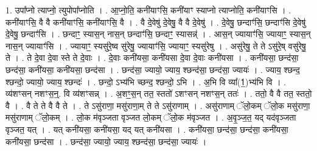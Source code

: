 \documentclass[17pt]{extarticle}
\begin{document}
1. उपा᳚प्नो त्याप्नो॒ त्युपोपा᳚प्नोति । . आ॒प्नो॒ति॒ कनी॑याꣳसि॒ कनी॑याꣳ स्याप्नो त्याप्नोति॒ कनी॑याꣳसि । . कनी॑याꣳसि॒ वै वै कनी॑याꣳसि॒ कनी॑याꣳसि॒ वै । . वै दे॒वेषु॑ दे॒वेषु॒ वै वै दे॒वेषु॑ । . दे॒वेषु॒ छन्दाꣳ॑सि॒ छन्दाꣳ॑सि दे॒वेषु॑ दे॒वेषु॒ छन्दाꣳ॑सि । . छन्दाꣳ॒॒ स्यास॒न् नास॒न् छन्दाꣳ॑सि॒ छन्दाꣳ॒॒ स्यासन्न्॑ । . आस॒न् ज्यायाꣳ॑सि॒ ज्यायाꣳ॒॒ स्यास॒न् नास॒न् ज्यायाꣳ॑सि । . ज्यायाꣳ॒॒ स्यसु॑रे॒ष्व सु॑रेषु॒ ज्यायाꣳ॑सि॒ ज्यायाꣳ॒॒ स्यसु॑रेषु । . असु॑रेषु॒ ते ते ऽसु॑रे॒ष् वसु॑रेषु॒ ते । . ते दे॒वा दे॒वा स्ते ते दे॒वाः । . दे॒वाः कनी॑यसा॒ कनी॑यसा दे॒वा दे॒वाः कनी॑यसा । . कनी॑यसा॒ छन्द॑सा॒ छन्द॑सा॒ कनी॑यसा॒ कनी॑यसा॒ छन्द॑सा । . छन्द॑सा॒ ज्यायो॒ ज्याय॒ श्छन्द॑सा॒ छन्द॑सा॒ ज्यायः॑ । . ज्याय॒ श्छन्द॒ श्छन्दो॒ ज्यायो॒ ज्याय॒ श्छन्दः॑ । . छन्दो॒ ऽभ्य॑भि च्छन्द॒ श्छन्दो॒ ऽभि । . अ॒भि वि व्या᳚(1॒)भ्य॑भि वि । . व्य॑शꣳसन् नशꣳस॒न्॒. वि व्य॑शꣳसन्न् । . अ॒शꣳ॒॒स॒न् तत॒ स्ततो॑ ऽशꣳसन् नशꣳस॒न् ततः॑ । . ततो॒ वै वै तत॒ स्ततो॒ वै । . वै ते ते वै वै ते । . ते ऽसु॑राणा॒ मसु॑राणा॒म् ते ते ऽसु॑राणाम् । . असु॑राणाम् ॅलो॒कम् ॅलो॒क मसु॑राणा॒ मसु॑राणाम् ॅलो॒कम् । . लो॒क म॑वृञ्जता वृञ्जत लो॒कम् ॅलो॒क म॑वृञ्जत । . अ॒वृ॒ञ्ज॒त॒ यद् यद॑वृञ्जता वृञ्जत॒ यत् । . यत् कनी॑यसा॒ कनी॑यसा॒ यद् यत् कनी॑यसा । . कनी॑यसा॒ छन्द॑सा॒ छन्द॑सा॒ कनी॑यसा॒ कनी॑यसा॒ छन्द॑सा । . छन्द॑सा॒ ज्यायो॒ ज्याय॒ श्छन्द॑सा॒ छन्द॑सा॒ ज्यायः॑ । \newline
\end{document}
